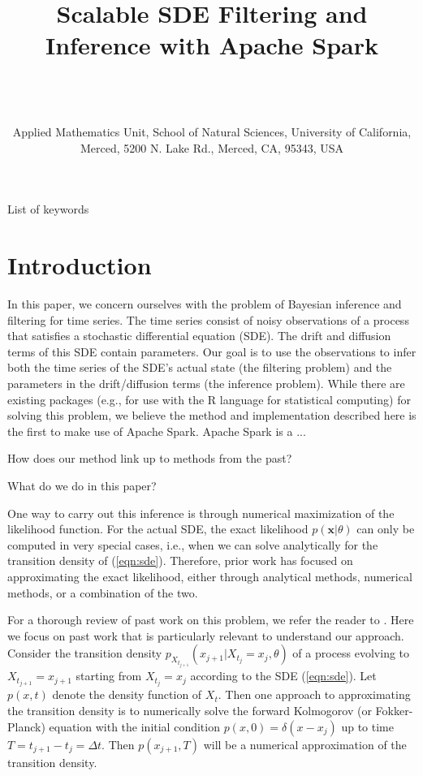 \documentclass[wcp]{jmlr}
\title[Scalable SDE Filtering and Inference]{Scalable SDE Filtering and Inference with Apache Spark}
\author{\Name{Harish S. Bhat} \Email{hbhat@ucmerced.edu}\\
\Name{R. W. M. A. Madushani} \Email{rmadushani@ucmerced.edu} \\
\Name{Shagun Rawat} \Email{srawat2@ucmerced.edu} \\
\addr Applied Mathematics Unit, School of Natural Sciences, University
of California, Merced, 5200 N. Lake Rd., Merced, CA, 95343, USA}
\begin{document}
\maketitle

\begin{abstract}

\end{abstract}
\begin{keywords}
List of keywords
\end{keywords}

\section{Introduction}
\label{sect:intro}
In this paper, we concern ourselves with the problem of 
Bayesian inference and filtering for time series.  The time series
consist of noisy observations of a process that satisfies a stochastic
differential equation (SDE).  The drift and diffusion terms  of this SDE contain parameters.  Our goal is to use the observations to infer
both the time series of the SDE's actual state (the filtering
problem) and the parameters in the drift/diffusion terms (the
inference problem).  While there are existing packages (e.g., for use
with the R language for statistical computing) for solving this
problem, we believe the method and implementation described here is
the first to make use of Apache Spark.  Apache Spark is a ...

How does our method link up to methods from the past?

What do we do in this paper?

One way to carry out this inference is through numerical maximization of the likelihood function.  For the actual SDE, the exact likelihood $p(\mathbf{x} | \theta)$ can only be computed in very special cases, i.e., when we can solve analytically for the transition density of (\ref{eqn:sde}).  Therefore, prior work has focused on approximating the exact likelihood, either through analytical methods, numerical methods, or a combination of the two.

For a thorough review of past work on this problem, we refer the reader to \citep{sorensen2004parametric, iacus2009simulation, fuchs2013inference}.  Here we focus on past work that is particularly relevant to understand our approach.  Consider the transition density $p_{X_{t_{j+1}}}(x_{j+1} | X_{t_j} = x_j, \theta)$  of a process evolving to $X_{t_{j+1}}=x_{j+1}$ starting from $X_{t_j} = x_j$  according to the SDE (\ref{eqn:sde}). Let $p(x,t)$ denote the density function of $X_t$.  Then one approach to approximating the transition density is to numerically solve the forward Kolmogorov (or Fokker-Planck) equation with the initial condition $p(x,0) = \delta(x-x_j)$ up to time $T = t_{j+1} - t_j = \Delta t$.  Then $p(x_{j+1},T)$ will be a numerical approximation of the transition density.
\end{document}
